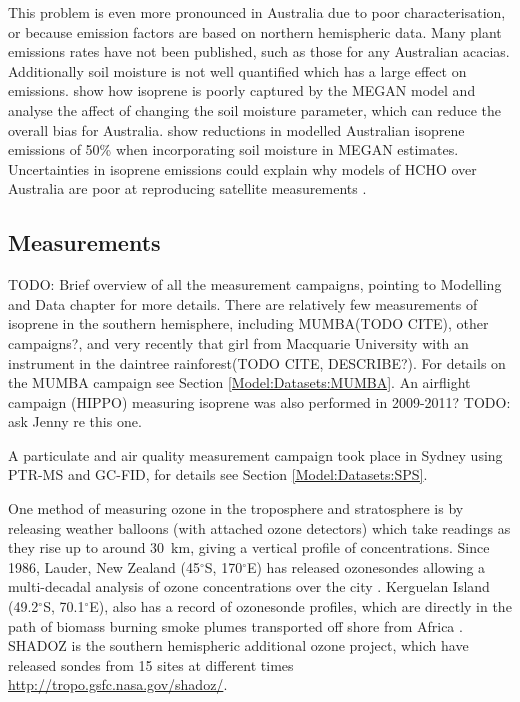    This problem is even more pronounced in Australia due to poor characterisation, or because emission factors are based on northern hemispheric data.
    Many plant emissions rates have not been published, such as those for any Australian acacias.
    Additionally soil moisture is not well quantified which has a large effect on emissions.
    \cite{Muller2008} show how isoprene is poorly captured by the MEGAN model and analyse the affect of changing the soil moisture parameter, which can reduce the overall bias for Australia.
    \cite{Sindelarova2014} show reductions in modelled Australian isoprene emissions of 50\% when incorporating soil moisture in MEGAN estimates. 
    Uncertainties in isoprene emissions could explain why models of HCHO over Australia are poor at reproducing satellite measurements \citep{Stavrakou2009}.
    
  
  
  \subsection{Measurements}
    
    TODO: Brief overview of all the measurement campaigns, pointing to Modelling and Data chapter for more details.
    There are relatively few measurements of isoprene in the southern hemisphere, including MUMBA(TODO CITE), other campaigns?, and very recently that girl from Macquarie University with an instrument in the daintree rainforest(TODO CITE, DESCRIBE?).
    For details on the MUMBA campaign see Section \ref{Model:Datasets:MUMBA}.
    An airflight campaign (HIPPO) measuring isoprene was also performed in 2009-2011? TODO: ask Jenny re this one.
    
    A particulate and air quality measurement campaign took place in Sydney using PTR-MS and GC-FID, for details see Section \ref{Model:Datasets:SPS}.
    
    One method of measuring ozone in the troposphere and stratosphere is by releasing weather balloons (with attached ozone detectors) which take readings as they rise up to around 30~km, giving a vertical profile of concentrations.
    Since 1986, Lauder, New Zealand (45$^{\circ}$S, 170$^{\circ}$E) has released ozonesondes allowing a multi-decadal analysis of ozone concentrations over the city \citep{Brinksma2002}.
    Kerguelan Island (49.2$^{\circ}$S, 70.1$^{\circ}$E), also has a record of ozonesonde profiles, which are directly in the path of biomass burning smoke plumes transported off shore from Africa \citep{Baray2012}.
    SHADOZ is the southern hemispheric additional ozone project, which have released sondes from 15 sites at different times \url{http://tropo.gsfc.nasa.gov/shadoz/}.
  
